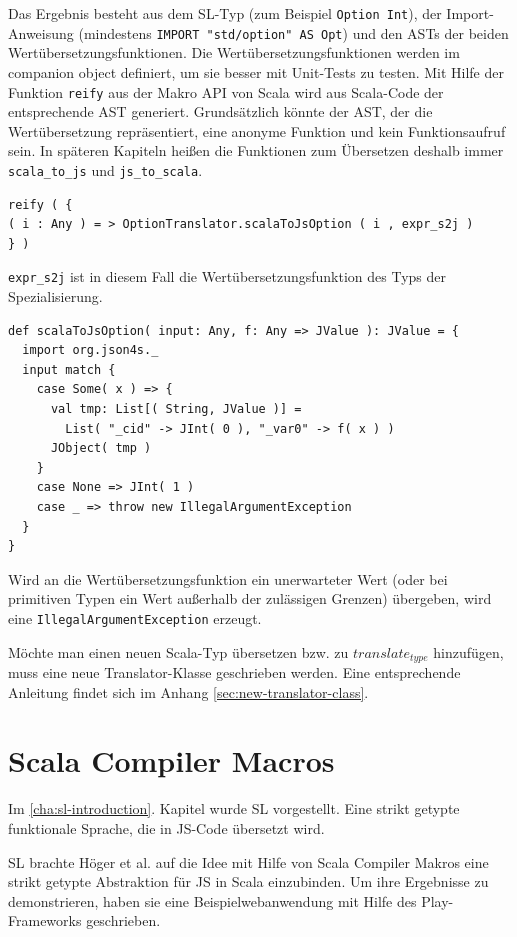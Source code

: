 \documentclass[12pt,bibtotoc]{scrreprt}
\begin{document}
Das Ergebnis besteht aus dem SL-Typ (zum Beispiel \lstinline!Option Int!), der Import-Anweisung (mindestens \lstinline!IMPORT "std/option" AS Opt!) und den ASTs der beiden Wertübersetzungsfunktionen. Die Wertübersetzungsfunktionen werden im companion object definiert, um sie besser mit Unit-Tests zu testen. Mit Hilfe der Funktion \lstinline!reify! aus der Makro API von Scala wird aus Scala-Code der entsprechende AST generiert. Grundsätzlich könnte der AST, der die Wertübersetzung repräsentiert, eine anonyme Funktion und kein Funktionsaufruf sein. In späteren Kapiteln heißen die Funktionen zum Übersetzen deshalb immer \lstinline!scala_to_js! und \lstinline!js_to_scala!.

\begin{lstlisting}
reify ( {
( i : Any ) = > OptionTranslator.scalaToJsOption ( i , expr_s2j )
} )
\end{lstlisting}

\lstinline!expr_s2j! ist in diesem Fall die Wertübersetzungsfunktion des Typs der Spezialisierung. 

\begin{lstlisting}
def scalaToJsOption( input: Any, f: Any => JValue ): JValue = {
  import org.json4s._
  input match {
    case Some( x ) => {
      val tmp: List[( String, JValue )] = 
        List( "_cid" -> JInt( 0 ), "_var0" -> f( x ) )
      JObject( tmp )
    }
    case None => JInt( 1 )
    case _ => throw new IllegalArgumentException
  }
}
\end{lstlisting}

Wird an die Wertübersetzungsfunktion ein unerwarteter Wert (oder bei primitiven Typen ein Wert außerhalb der zulässigen Grenzen) übergeben, wird eine \lstinline!IllegalArgumentException! erzeugt.

Möchte man einen neuen Scala-Typ übersetzen bzw. zu $translate_{type}$ hinzufügen, muss eine neue Translator-Klasse geschrieben werden. Eine entsprechende Anleitung findet sich im Anhang \ref{sec:new-translator-class}.

\chapter{Scala Compiler Macros}
\label{chap:scala-compiler-macros}

Im \ref{cha:sl-introduction}. Kapitel wurde SL vorgestellt. Eine strikt getypte funktionale Sprache, die in JS-Code übersetzt wird.

SL brachte Höger et al. auf die Idee mit Hilfe von Scala Compiler Makros eine strikt getypte Abstraktion für JS in Scala einzubinden\cite{Hoger2013}. Um ihre Ergebnisse zu demonstrieren, haben sie eine Beispielwebanwendung mit Hilfe des Play-Frameworks\cite{Play1} geschrieben. 
\end{document}
